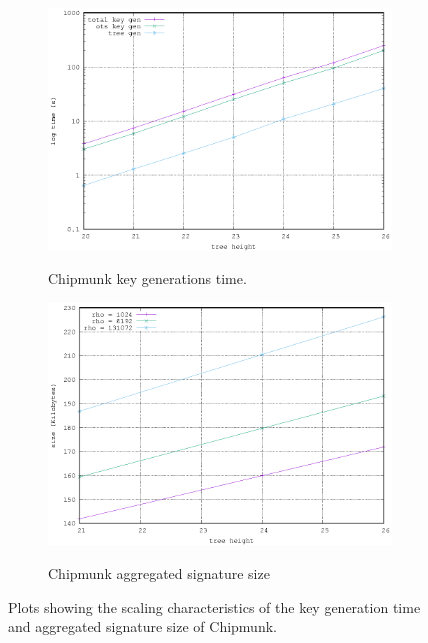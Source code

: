 \begin{figure}[H] 
  \centering
  \begin{subfigure}[b]
  {0.49\textwidth}    \centering
  \includegraphics[trim={1mm 0 4mm 0},clip,width=\textwidth]{figures/key_gen.eps}\\
  \caption{Chipmunk key generations time.}
  \label{fig:keygen}
  \end{subfigure}
\begin{subfigure}[b]{0.49\textwidth}    \centering
  \includegraphics[trim={1mm 0 4mm 0},clip,width=\textwidth]{figures/sig_size.eps}\\
  \caption{Chipmunk aggregated signature size}
  \label{fig:sigize}
  \end{subfigure}
  \caption{Plots showing the scaling characteristics of the key generation time and aggregated signature size of Chipmunk.}
\end{figure}

